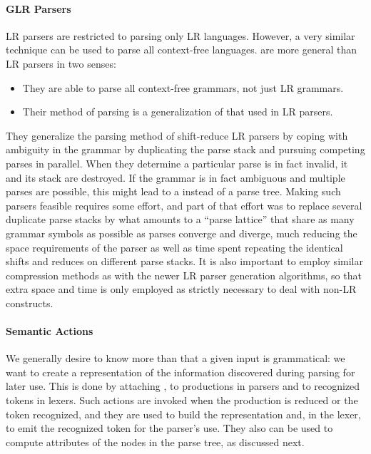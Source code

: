 \paragraph{GLR Parsers} LR parsers are restricted to parsing only LR languages. However, a very similar technique can be used to parse all context-free languages.  are more general than LR parsers in two senses: 
\begin{itemize}
\item They are able to parse all context-free grammars, not just LR grammars.
\item Their method of parsing is a generalization of that used in LR parsers.
\end{itemize}
They generalize the parsing method of shift-reduce LR parsers by coping with ambiguity in the grammar by duplicating the parse stack and pursuing competing parses in parallel. When they determine a particular parse is in fact invalid, it and its stack are destroyed. If the grammar is in fact ambiguous and multiple parses are possible, this might lead to a  instead of a parse tree. Making such parsers feasible requires some effort, and part of that effort was to replace several duplicate parse stacks by what amounts to a ``parse lattice'' that share as many grammar symbols as possible as parses converge and diverge, much reducing the space requirements of the parser as well as time spent repeating the identical shifts and reduces on different parse stacks. It is also important to employ similar compression methods as with the newer LR parser generation algorithms, so that extra space and time is only employed as strictly necessary to deal with non-LR constructs.

\paragraph{Semantic Actions}
We generally desire to know more than that a given input is grammatical: we want to create a representation of the information discovered during parsing for later use. This is done by attaching , to productions in parsers and to recognized tokens in lexers. Such actions are invoked when the production is reduced or the token recognized, and they are used to build the representation and, in the lexer, to emit the recognized token for the parser's use. They also can be used to compute attributes of the nodes in the parse tree, as discussed next.


